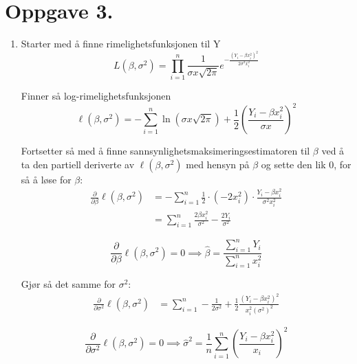 \documentclass[a4paper,11pt,norsk]{article}
\begin{document}
\section*{Oppgave 3.}
\begin{enumerate}
    \item Starter med å finne rimelighetsfunksjonen til Y
        \[
            \mathit{L}(\beta, \sigma^2) = \prod_{i=1}^{n} \frac{1}{\sigma x \sqrt{2\pi}} e^{-\frac{(Y_i - \beta x_i^2)^2}{2\sigma^2 x_i^2}}
        \]

        Finner så log-rimelighetsfunksjonen
        \[
            \ell(\beta, \sigma^2) = - \sum_{i=1}^{n} \ln{\left(\sigma x \sqrt{2\pi}\right) + \frac{1}{2} \left(\frac{Y_i - \beta x_i^2}{\sigma x}\right)^2}
        \]

        Fortsetter så med å finne sannsynlighetsmaksimeringsestimatoren til $\beta$ ved å ta den partiell deriverte av $\ell(\beta, \sigma^2)$ med hensyn på $\beta$ og sette den lik 0, for 
        så å løse for $\beta$:
        \begin{align*}
            \frac{\partial}{\partial \beta} \ell(\beta, \sigma^2) &= - \sum_{i=1}^{n} \frac{1}{2} \cdot (-2x_i^2) \cdot \frac{Y_i - \beta x_i^2}{\sigma^2 x_i^2} \\
                                                                  &= \sum_{i=1}^{n} \frac{2\beta x_i^2}{\sigma^2} - \frac{2Y_i}{\sigma^2}
        \end{align*}

        \[
            \frac{\partial}{\partial \beta} \ell(\beta, \sigma^2) = 0 \implies \boxed{\hat{\beta} = \frac{\sum_{i=1}^{n} Y_i}{\sum_{i=1}^{n} x_i^2}}
        \]

        Gjør så det samme for $\sigma^2$:
        \begin{align*}
            \frac{\partial}{\partial \sigma^2} \ell(\beta, \sigma^2) &= \sum_{i=1}^{n} -\frac{1}{2\sigma^2} + \frac{1}{2} \frac{(Y_i - \beta x_i^2)^2}{x_i^2 \left(\sigma^2\right)^2} 
        \end{align*}

        \[
            \frac{\partial}{\partial \sigma^2} \ell(\beta, \sigma^2) = 0 \implies \boxed{\hat{\sigma}^2 = \frac{1}{n} \sum_{i=1}^{n} \left(\frac{Y_i - \beta x_i^2}{x_i}\right)^2}
        \]

\end{enumerate}
\end{document}
